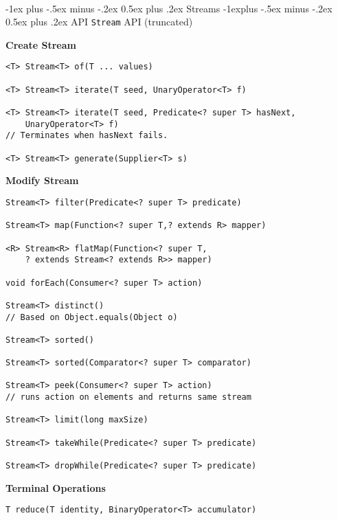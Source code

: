 \documentclass[10pt, landscape]{article}
\makeatletter
\renewcommand{\section}{\@startsection{section}{1}{0mm}%
                                {-1ex plus -.5ex minus -.2ex}%
                                {0.5ex plus .2ex}%
                                {\normalfont\large\bfseries}}
\renewcommand{\subsection}{\@startsection{subsection}{2}{0mm}%
                                {-1explus -.5ex minus -.2ex}%
                                {0.5ex plus .2ex}%
                                {\normalfont\normalsize\bfseries}}
\newcommand{\code}[1]{\textcolor{myblue}{\texttt{#1}}}
\makeatother
\begin{document}
\hrulefill \\
\pagebreak
\begin{multicols}{2}
\setlength{\columnseprule}{0.25pt}

\section{Streams}
\subsection{API}
\code{Stream} API (truncated)

\textbf{Create Stream}
\begin{verbatim}
<T> Stream<T> of(T ... values)

<T> Stream<T> iterate(T seed, UnaryOperator<T> f)

<T> Stream<T> iterate(T seed, Predicate<? super T> hasNext, 
    UnaryOperator<T> f)
// Terminates when hasNext fails. 

<T> Stream<T> generate(Supplier<T> s)

\end{verbatim}

\textbf{Modify Stream}
\begin{verbatim}
Stream<T> filter(Predicate<? super T> predicate)

Stream<T> map(Function<? super T,? extends R> mapper)

<R> Stream<R> flatMap(Function<? super T, 
    ? extends Stream<? extends R>> mapper)

void forEach(Consumer<? super T> action)

Stream<T> distinct()
// Based on Object.equals(Object o)

Stream<T> sorted()

Stream<T> sorted(Comparator<? super T> comparator)

Stream<T> peek(Consumer<? super T> action)
// runs action on elements and returns same stream

Stream<T> limit(long maxSize)

Stream<T> takeWhile(Predicate<? super T> predicate)

Stream<T> dropWhile(Predicate<? super T> predicate)

\end{verbatim}

\textbf{Terminal Operations}
\begin{verbatim}
T reduce(T identity, BinaryOperator<T> accumulator)


\end{verbatim}
\end{multicols}
\end{document}
